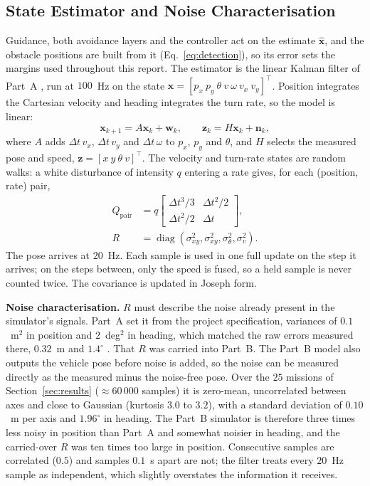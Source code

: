 \subsection{State Estimator and Noise Characterisation}
\label{sec:estimator}
Guidance, both avoidance layers and the controller act on the estimate $\hat{\mathbf{x}}$, and the
obstacle positions are built from it (Eq.~\eqref{eq:detection}), so its
error sets the margins used throughout this report. The estimator is
the linear Kalman filter \cite{urrea2021} of Part~A \cite{partA_est}, run at $100$~Hz on
the state $\mathbf{x} = [p_{x}\ p_{y}\ \theta\ v\ \omega\ v_{x}\ v_{y}]^{\top}$.
Position integrates the Cartesian velocity and heading integrates the
turn rate, so the model is linear:
\begin{equation}
    \mathbf{x}_{k+1} = A\mathbf{x}_{k} + \mathbf{w}_{k}, \qquad
    \mathbf{z}_{k} = H\mathbf{x}_{k} + \mathbf{n}_{k},
    \label{eq:kf}
\end{equation}
where $A$ adds $\Delta t\,v_{x}$, $\Delta t\,v_{y}$ and $\Delta t\,\omega$
to $p_{x}$, $p_{y}$ and $\theta$, and $H$ selects the measured pose and
speed, $\mathbf{z} = [x\ y\ \theta\ v]^{\top}$. The velocity and
turn-rate states are random walks: a white disturbance of intensity $q$
entering a rate gives, for each (position, rate) pair,
\begin{equation}
\begin{aligned}
    Q_{\text{pair}} &= q\begin{bmatrix} \Delta t^{3}/3 & \Delta t^{2}/2 \\ \Delta t^{2}/2 & \Delta t \end{bmatrix}, \\
    R &= \operatorname{diag}(\sigma_{xy}^{2}, \sigma_{xy}^{2}, \sigma_{\theta}^{2}, \sigma_{v}^{2}).
\end{aligned}
\label{eq:kfnoise}
\end{equation}
The pose arrives at $20$~Hz. Each sample is used in one full update on
the step it arrives; on the steps between, only the speed is fused, so a
held sample is never counted twice. The covariance is updated in Joseph
form.

\textbf{Noise characterisation.} $R$ must describe the noise already
present in the simulator's signals. Part~A set it from the project
specification, variances of $0.1$~m$^{2}$ in position and $2$~deg$^{2}$
in heading, which matched the raw errors measured there, $0.32$~m and
$1.4^{\circ}$ \cite{partA_est}. That $R$ was carried into Part~B. The
Part~B model also outputs the vehicle pose before noise is added, so
the noise can be measured directly as the measured minus the noise-free
pose. Over the $25$ missions of Section~\ref{sec:results}
($\approx 60\,000$ samples) it is zero-mean, uncorrelated between axes and
close to Gaussian (kurtosis $3.0$ to $3.2$), with a standard deviation of $0.10$~m per axis and
$1.96^{\circ}$ in heading. The
Part~B simulator is therefore three times less noisy in position than
Part~A and somewhat noisier in heading, and the carried-over $R$ was
ten times too large in position. Consecutive samples are correlated ($0.5$) and samples
$0.1$~s apart are not; the filter treats every $20$~Hz sample as
independent, which slightly overstates the information it receives.

